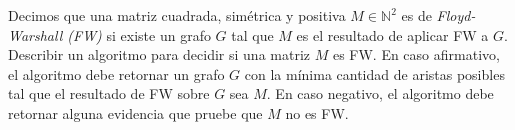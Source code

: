 
 \item Decimos que una matriz cuadrada, simétrica y positiva $M \in \mathbb{N}^2$ es de \emph{Floyd-Warshall (FW)} si existe un grafo $G$ tal que $M$ es el resultado de aplicar FW a $G$.  Describir un algoritmo para decidir si una matriz $M$ es FW.  En caso afirmativo, el algoritmo debe retornar un grafo $G$ con la mínima cantidad de aristas posibles tal que el resultado de FW sobre $G$ sea $M$.  En caso negativo, el algoritmo debe retornar alguna evidencia que pruebe que $M$ no es FW.


